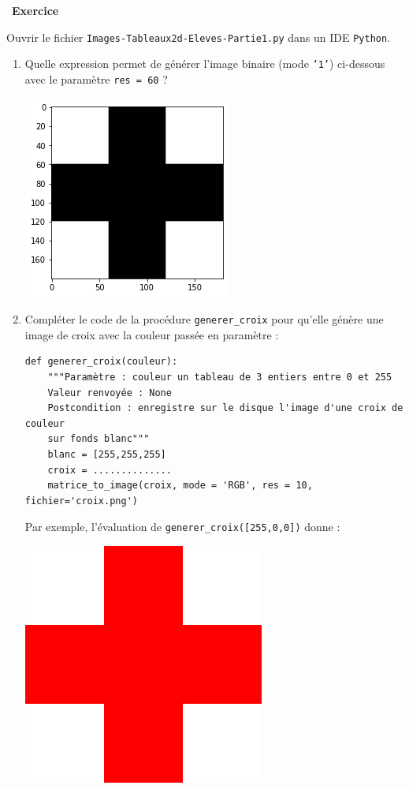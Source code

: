 \documentclass[a4paper, french, 12pt]{article}
\newcounter{exo}
\newenvironment{exercice}[1]
{\par \medskip   \addtocounter{exo}{1} \noindent  
\begin{bclogo}[arrondi =0.1,   noborder = true, logo=\bccrayon, marge=4]{~\textbf{Exercice} \textbf{\theexo} {\itshape #1} }  \par}
{
\end{bclogo}
 \par \bigskip }
\newcounter{def}
\begin{document}
\begin{exercice}{}

Ouvrir le fichier \texttt{Images-Tableaux2d-Eleves-Partie1.py} dans un IDE \texttt{Python}.


\begin{enumerate}
	 \item Quelle expression permet de générer l'image binaire (mode \texttt{'1'}) ci-dessous avec le paramètre \texttt{res = 60}   ?

\begin{center}
\includegraphics[scale=0.35]{images/croix_binaire.png}
\end{center}
	
	\item Compléter le code de la procédure \texttt{generer\_croix} pour qu'elle génère une image de croix avec la couleur passée en paramètre :

\begin{lstlisting}[style=rond]
def generer_croix(couleur):
	"""Paramètre : couleur un tableau de 3 entiers entre 0 et 255
	Valeur renvoyée : None
	Postcondition : enregistre sur le disque l'image d'une croix de couleur
	sur fonds blanc"""
    blanc = [255,255,255]
    croix = ..............
    matrice_to_image(croix, mode = 'RGB', res = 10, fichier='croix.png')  
\end{lstlisting}

Par exemple, l'évaluation de \texttt{generer\_croix([255,0,0])} donne :
\begin{center}
\includegraphics[scale=0.2]{images/croix.png}
\end{center}
\end{enumerate}


\end{exercice}
\end{document}
